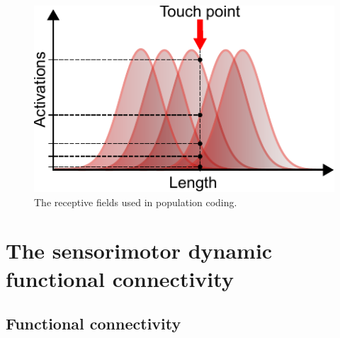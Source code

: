 \begin{figure}[!t]
	\begin{center}
		\hspace*{\fill}
		\includegraphics[width=0.8\columnwidth]{pop_coding_sketch.pdf}
		\hspace*{\fill}
	\end{center}
	\caption{\label{fig:population_coding} The receptive fields used in population coding.}
\end{figure}
\section{The sensorimotor dynamic functional connectivity}

\subsection{Functional connectivity}

